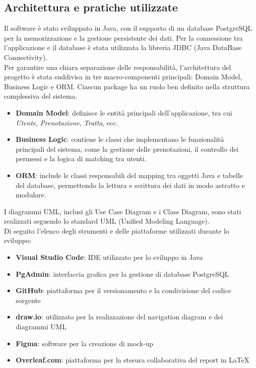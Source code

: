 \subsection{Architettura e pratiche utilizzate}
Il software è stato sviluppato in Java, con il supporto di un database PostgreSQL per la memorizzazione e la gestione persistente dei dati. Per la connessione tra l’applicazione e il database è stata utilizzata la libreria JDBC (Java DataBase Connectivity).\\
\noindent
Per garantire una chiara separazione delle responsabilità, l’architettura del progetto è stata suddivisa in tre macro-componenti principali: Domain Model, Business Logic e ORM. Ciascun package ha un ruolo ben definito nella struttura complessiva del sistema.
\begin{itemize}
\item \textbf{Domain Model}: definisce le entità principali dell’applicazione, tra cui \textit{Utente}, \textit{Prenotazione}, \textit{Tratta}, ecc.
\item \textbf{Business Logic}: contiene le classi che implementano le funzionalità principali del sistema, come la gestione delle prenotazioni, il controllo dei permessi e la logica di matching tra utenti.
\item \textbf{ORM}: include le classi responsabili del mapping tra oggetti Java e tabelle del database, permettendo la lettura e scrittura dei dati in modo astratto e modulare.
\end{itemize}
I diagrammi UML, inclusi gli Use Case Diagram e i Class Diagram, sono stati realizzati seguendo lo standard UML (Unified Modeling Language).\\
\noindent Di seguito l’elenco degli strumenti e delle piattaforme utilizzati durante lo sviluppo:
\begin{itemize}
\item \textbf{Visual Studio Code}: IDE utilizzato per lo sviluppo in Java
\item \textbf{PgAdmin}: interfaccia grafica per la gestione di database PostgreSQL
\item \textbf{GitHub}: piattaforma per il versionamento e la condivisione del codice sorgente
\item \textbf{draw.io}: utilizzato per la realizzazione del navigation diagram e dei diagrammi UML
\item \textbf{Figma}: software per la creazione di mock-up
\item \textbf{Overleaf.com}: piattaforma per la stesura collaborativa del report in \LaTeX
\end{itemize}

\newpage